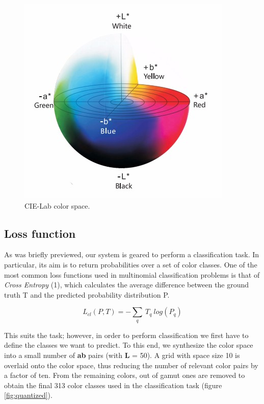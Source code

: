 \documentclass[twoside,twocolumn]{article}
\begin{document}
\begin{figure} [h]
	\includegraphics[width=\linewidth]{img/cielab.jpg}
	\caption{CIE-Lab color space.}
	\label{fig:cielab}
\end{figure}

\subsection{Loss function}
As was briefly previewed, our system is geared to perform a classification task. In particular, its aim is to return probabilities over a set of color classes. One of the most common loss functions used in multinomial classification problems is that of \textit{Cross Entropy} (1), which calculates the average difference between the ground truth T and the predicted probability distribution P.

\begin{equation}
L_{cl}(P,T) = - \sum_{q} \: T_q \: log(P_q)
\end{equation}

This suits the task; however, in order to perform classification we first have to define the classes we want to predict. To this end, we synthesize the color space into a small number of \textbf{ab} pairs (with \textbf{L} = 50). A grid with space size 10 is overlaid onto the color space, thus reducing the number of relevant color pairs by a factor of ten. From the remaining colors, out of gamut ones are removed to obtain the final 313 color classes used in the classification task (figure \ref{fig:quantized}).
\end{document}
